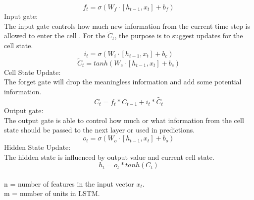\documentclass[12pt,a4paper]{article}
\begin{document}
\begin{equation}
    f_t = \sigma( W_f \cdot [ h_{t-1} , x_t ] + b_f ) 
\end{equation}
Input gate: 
\\[1ex]
The input gate controls how much new information from the current time step is allowed to enter the cell \parencite{hochreiter1997lstm}. For the $\widetilde{C}_t$, the purpose is to suggest updates for the cell state. 
\begin{equation}
    i_t = \sigma( W_i \cdot [ h_{t-1} , x_t ] + b_c ) 
\end{equation}
\begin{equation}
    \widetilde{C}_t = tanh( W_c \cdot [ h_{t-1} , x_t ] + b_c )
\end{equation}
Cell State Update:
\\[1ex]
The forget gate will drop the meaningless information and add some potential information.
\begin{equation}
    C_t = f_t * C_{t-1} + i_t * \widetilde{C_t}
\end{equation}
Output gate:
\\[1ex]
The output gate is able to control how much or what information from the cell state should be passed to the next layer or used in predictions. 
\begin{equation}
    o_t = \sigma( W_o \cdot [ h_{t-1} , x_t ] + b_o )
\end{equation}
Hidden State Update:
\\[1ex]
The hidden state is influenced by output value and current cell state. 
\begin{equation}
    h_t = o_t * tanh(C_t)
\end{equation}
\\[1ex]
n = number of features in the input vector $x_t$.\\
m = number of units in LSTM.\\
\end{document}
